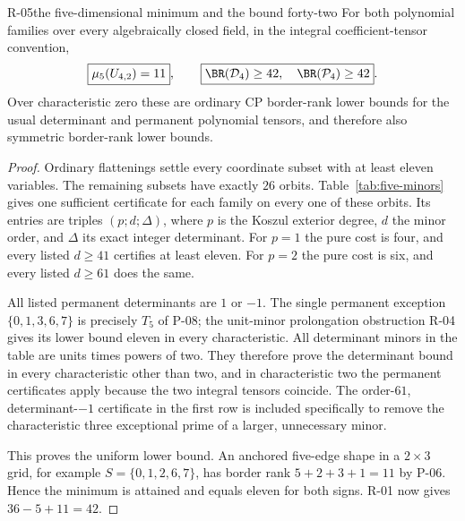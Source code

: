 \begin{finding}{R-05}{the five-dimensional minimum and the bound forty-two}
For both polynomial families over every algebraically closed
field, in the integral coefficient-tensor convention,
\[
 \boxed{\mu_5(U_{4,2})=11},\qquad
 \boxed{\BR(\mathcal D_4)\geq42,\quad
        \BR(\mathcal P_4)\geq42}.
\]
Over characteristic zero these are ordinary CP border-rank
lower bounds for the usual determinant and permanent
polynomial tensors, and therefore also symmetric
border-rank lower bounds.
\end{finding}
\begin{proof}
Ordinary flattenings settle every coordinate subset with
at least eleven variables. The remaining subsets have
exactly \(26\) orbits. Table~\ref{tab:five-minors}
gives one sufficient certificate for each family on every
one of these orbits. Its entries are triples
\((p;d;\Delta)\), where \(p\) is the Koszul exterior degree,
\(d\) the minor order, and \(\Delta\) its exact integer
determinant. For \(p=1\) the pure cost is four, and every
listed \(d\geq41\) certifies at least eleven. For \(p=2\)
the pure cost is six, and every listed \(d\geq61\)
does the same.

All listed permanent determinants are \(1\) or \(-1\).
The single permanent exception \(\{0,1,3,6,7\}\) is
precisely \(T_5\) of P-08; the unit-minor prolongation
obstruction R-04 gives its lower bound eleven in every
characteristic. All determinant minors in the table are
units times powers of two. They therefore prove the
determinant bound in every characteristic other than two,
and in characteristic two the permanent certificates apply
because the two integral tensors coincide. The
order-\(61\), determinant-\(-1\) certificate in the first
row is included specifically to remove the characteristic
three exceptional prime of a larger, unnecessary minor.

This proves the uniform lower bound. An anchored five-edge
shape in a \(2\times3\) grid, for example
\(S=\{0,1,2,6,7\}\), has border rank
\(5+2+3+1=11\) by P-06. Hence the minimum is attained and
equals eleven for both signs. R-01 now gives
\(36-5+11=42\).
\end{proof}

